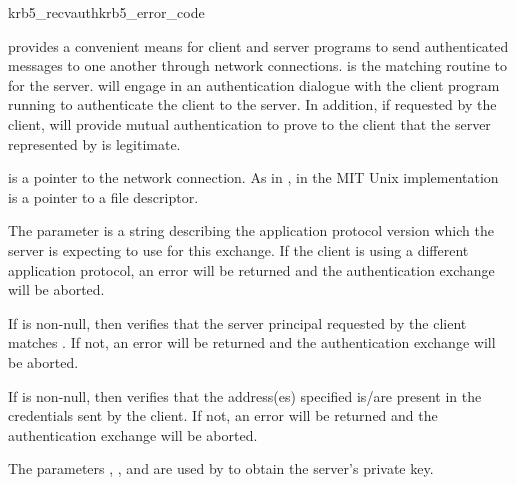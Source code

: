 \begin{funcdecl}{krb5_recvauth}{krb5_error_code}
\funcin
{}
\funcendfuncarg
{}
\funcout
{}
\end{funcdecl}

 provides a convenient means for client and
server programs to send authenticated messages to one another through
network connections.   is the matching routine
to  for the server.  
will engage in an authentication dialogue with the
client program running  to authenticate the
client to the server.  In addition, if requested by the client,
 will provide mutual authentication to
prove to the client that the server represented by
 is legitimate. 

 is a pointer to the network connection.  As in
, in the MIT Unix implementation
 is a pointer to a file descriptor.

The parameter  is a string describing the
application protocol version which the server is expecting to use for
this exchange.  If the client is using a different application protocol,
an error will be returned and the authentication exchange will be
aborted.

If  is non-null, then 
verifies that the server principal requested by the client matches
.  If not, an error will be returned and the
authentication exchange will be aborted.

If  is non-null, then 
verifies that the address(es) specified is/are present in the
credentials sent by the client.  If not, an error will be returned and
the authentication exchange will be aborted.

The parameters , , and
 are used by  to obtain the
server's private key.

